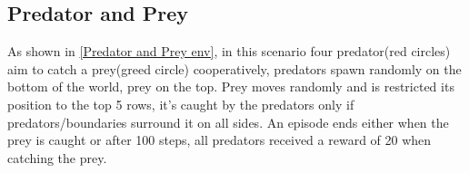 \documentclass{article} %
\begin{document}
\subsection{Predator and Prey}
As shown in \ref{Predator and Prey env}, in this scenario four predator(red circles) aim to catch a prey(greed circle) cooperatively, predators spawn randomly on the bottom of the world, prey on the top. Prey moves randomly and is restricted its position to the top 5 rows, it's caught by the predators only if predators/boundaries surround it on all sides. An episode ends either when the prey is caught or after 100 steps, all predators received a reward of 20 when catching the prey.

\end{document}
